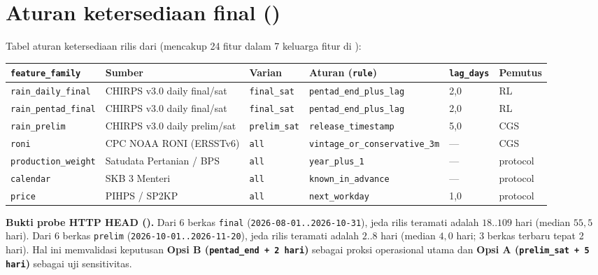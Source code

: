 \documentclass[11pt,a4paper]{article}
\begin{document}
\section{Aturan ketersediaan final ()}
Tabel aturan ketersediaan rilis dari  (mencakup 24 fitur dalam 7 keluarga fitur di ):
\begin{table}[H]
\centering
\footnotesize
\begin{tabular}{@{}L{2.8cm}L{3.4cm}L{1.8cm}L{3.4cm}C{1.2cm}C{1.4cm}@{}}
\toprule
\texttt{feature\_family} & Sumber & Varian & Aturan (\texttt{rule}) & \texttt{lag\_days} & Pemutus \\
\midrule
\texttt{rain\_daily\_final} & CHIRPS v3.0 daily final/sat & \texttt{final\_sat} & \texttt{pentad\_end\_plus\_lag} & 2{,}0 & RL \\
\texttt{rain\_pentad\_final} & CHIRPS v3.0 daily final/sat & \texttt{final\_sat} & \texttt{pentad\_end\_plus\_lag} & 2{,}0 & RL \\
\texttt{rain\_prelim} & CHIRPS v3.0 daily prelim/sat & \texttt{prelim\_sat} & \texttt{release\_timestamp} & 5{,}0 & CGS \\
\texttt{roni} & CPC NOAA RONI (ERSSTv6) & \texttt{all} & \texttt{vintage\_or\_conservative\_3m} & --- & CGS \\
\texttt{production\_weight} & Satudata Pertanian / BPS & \texttt{all} & \texttt{year\_plus\_1} & --- & protocol \\
\texttt{calendar} & SKB 3 Menteri & \texttt{all} & \texttt{known\_in\_advance} & --- & protocol \\
\texttt{price} & PIHPS / SP2KP & \texttt{all} & \texttt{next\_workday} & 1{,}0 & protocol \\
\bottomrule
\end{tabular}
\end{table}

\noindent\textbf{Bukti probe HTTP HEAD ().}
Dari 6 berkas \texttt{final} (\texttt{2026-08-01..2026-10-31}), jeda rilis teramati adalah $18..109$ hari (median $55{,}5$ hari). Dari 6 berkas \texttt{prelim} (\texttt{2026-10-01..2026-11-20}), jeda rilis teramati adalah $2..8$ hari (median $4{,}0$ hari; 3 berkas terbaru tepat 2 hari). Hal ini memvalidasi keputusan \textbf{Opsi B (\texttt{pentad\_end + 2 hari})} sebagai proksi operasional utama dan \textbf{Opsi A (\texttt{prelim\_sat + 5 hari})} sebagai uji sensitivitas.
\end{document}
